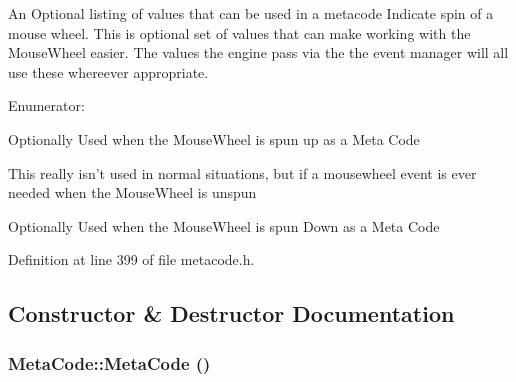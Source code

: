 An Optional listing of values that can be used in a metacode Indicate spin of a mouse wheel. This is optional set of values that can make working with the MouseWheel easier. The values the engine pass via the the event manager will all use these whereever appropriate. \begin{Desc}
\item[Enumerator: ]\par
\begin{description}
\item[{\em 
\hypertarget{classMetaCode_a31155465656363d4ecdf9ce7ae5d7227af0b2479902511454e2018979ee5e39e5}{
MOUSEWHEEL\_\-UP}
\label{d7/d72/classMetaCode_a31155465656363d4ecdf9ce7ae5d7227af0b2479902511454e2018979ee5e39e5}
}]Optionally Used when the MouseWheel is spun up as a Meta Code \item[{\em 
\hypertarget{classMetaCode_a31155465656363d4ecdf9ce7ae5d7227a70b73f42dccd13d9652d83c5f24cd966}{
MOUSEWHEEL\_\-UNCHANGED}
\label{d7/d72/classMetaCode_a31155465656363d4ecdf9ce7ae5d7227a70b73f42dccd13d9652d83c5f24cd966}
}]This really isn't used in normal situations, but if a mousewheel event is ever needed when the MouseWheel is unspun \item[{\em 
\hypertarget{classMetaCode_a31155465656363d4ecdf9ce7ae5d7227a912c43d8503790ded562c0c4a6a62ca7}{
MOUSEWHEEL\_\-DOWN}
\label{d7/d72/classMetaCode_a31155465656363d4ecdf9ce7ae5d7227a912c43d8503790ded562c0c4a6a62ca7}
}]Optionally Used when the MouseWheel is spun Down as a Meta Code \end{description}
\end{Desc}



Definition at line 399 of file metacode.h.

\subsection{Constructor \& Destructor Documentation}
\hypertarget{classMetaCode_a6d4637b2894e5a2d46577c08259a2416}{
\subsubsection[{MetaCode}]{\setlength{\rightskip}{0pt plus 5cm}MetaCode::MetaCode ()}}
\label{d7/d72/classMetaCode_a6d4637b2894e5a2d46577c08259a2416}


